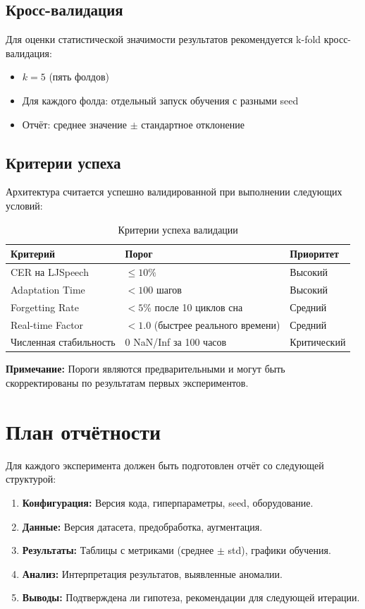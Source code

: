 \subsection{Кросс-валидация}

Для оценки статистической значимости результатов рекомендуется k-fold кросс-валидация:
\begin{itemize}
    \item $k = 5$ (пять фолдов)
    \item Для каждого фолда: отдельный запуск обучения с разными seed
    \item Отчёт: среднее значение $\pm$ стандартное отклонение
\end{itemize}

\subsection{Критерии успеха}

Архитектура считается успешно валидированной при выполнении следующих условий:

\begin{table}[h]
\centering
\caption{Критерии успеха валидации}
\label{tab:success_criteria}
\begin{tabular}{lp{5cm}l}
\toprule
\textbf{Критерий} & \textbf{Порог} & \textbf{Приоритет} \\
\midrule
CER на LJSpeech & $\leq 10\%$ & Высокий \\
Adaptation Time & $< 100$ шагов & Высокий \\
Forgetting Rate & $< 5\%$ после 10 циклов сна & Средний \\
Real-time Factor & $< 1.0$ (быстрее реального времени) & Средний \\
Численная стабильность & 0 NaN/Inf за 100 часов & Критический \\
\bottomrule
\end{tabular}
\end{table}

\textbf{Примечание:} Пороги являются предварительными и могут быть скорректированы по результатам первых экспериментов.

\section{План отчётности}

Для каждого эксперимента должен быть подготовлен отчёт со следующей структурой:

\begin{enumerate}
    \item \textbf{Конфигурация:} Версия кода, гиперпараметры, seed, оборудование.
    \item \textbf{Данные:} Версия датасета, предобработка, аугментация.
    \item \textbf{Результаты:} Таблицы с метриками (среднее $\pm$ std), графики обучения.
    \item \textbf{Анализ:} Интерпретация результатов, выявленные аномалии.
    \item \textbf{Выводы:} Подтверждена ли гипотеза, рекомендации для следующей итерации.
\end{enumerate}

